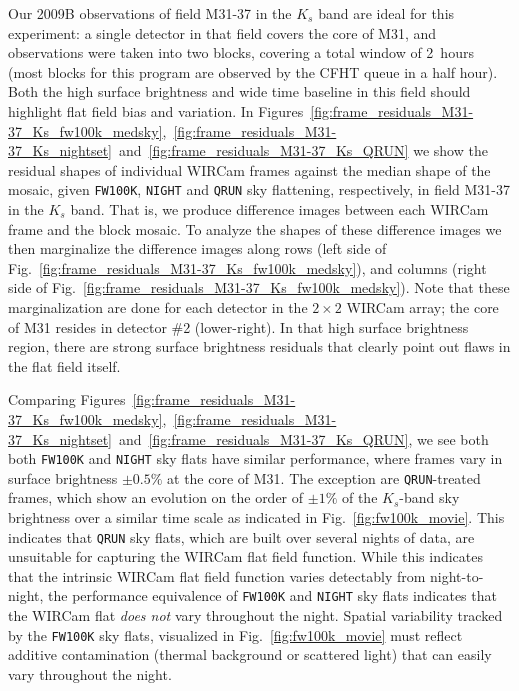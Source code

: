 \documentclass[iop]{emulateapj}
\newcommand{\Fig}[1]{Fig.~\ref{fig:#1}}  %
\begin{document}
Our 2009B observations of field M31-37 in the $K_s$ band are ideal for this experiment: a single detector in that field covers the core of M31, and observations were taken into two blocks, covering a total window of 2~hours (most blocks for this program are observed by the CFHT queue in a half hour).
Both the high surface brightness and wide time baseline in this field should highlight flat field bias and variation.
In Figures~\ref{fig:frame_residuals_M31-37_Ks_fw100k_medsky},~\ref{fig:frame_residuals_M31-37_Ks_nightset}~and~\ref{fig:frame_residuals_M31-37_Ks_QRUN} we show the residual shapes of individual WIRCam frames against the median shape of the mosaic, given \texttt{FW100K}, \texttt{NIGHT} and \texttt{QRUN} sky flattening, respectively, in field M31-37 in the $K_s$ band.
That is, we produce difference images between each WIRCam frame and the block mosaic.
To analyze the shapes of these difference images we then marginalize the difference images along rows (left side of \Fig{frame_residuals_M31-37_Ks_fw100k_medsky}), and columns (right side of \Fig{frame_residuals_M31-37_Ks_fw100k_medsky}).
Note that these marginalization are done for each detector in the $2\times2$ WIRCam array; the core of M31 resides in detector \#2 (lower-right).
In that high surface brightness region, there are strong surface brightness residuals that clearly point out flaws in the flat field itself.

Comparing Figures~\ref{fig:frame_residuals_M31-37_Ks_fw100k_medsky},~\ref{fig:frame_residuals_M31-37_Ks_nightset}~and~\ref{fig:frame_residuals_M31-37_Ks_QRUN}, we see both both \texttt{FW100K} and \texttt{NIGHT} sky flats have similar performance, where frames vary in surface brightness $\pm 0.5\%$ at the core of M31.
The exception are \texttt{QRUN}-treated frames, which show an evolution on the order of $\pm 1\%$ of the $K_s$-band sky brightness over a similar time scale as indicated in \Fig{fw100k_movie}.
This indicates that \texttt{QRUN} sky flats, which are built over several nights of data, are unsuitable for capturing the WIRCam flat field function.
While this indicates that the intrinsic WIRCam flat field function varies detectably from night-to-night, the performance equivalence of \texttt{FW100K} and \texttt{NIGHT} sky flats indicates that the WIRCam flat \emph{does not} vary throughout the night.
Spatial variability tracked by the \texttt{FW100K} sky flats, visualized in \Fig{fw100k_movie} must reflect additive contamination (thermal background or scattered light) that can easily vary throughout the night.
\end{document}
